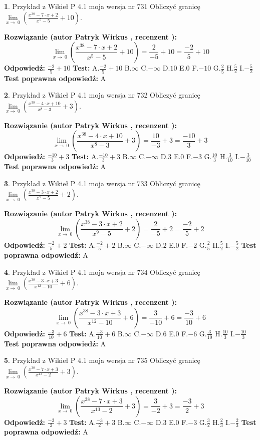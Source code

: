 \documentclass[12pt, a4paper]{article}
\theoremstyle{definition} %
\newtheorem{zad}{}
\newcommand{\zadStart}[1]{\begin{zad}#1\newline}
\newcommand{\zadStop}{\end{zad}}
\newcommand{\rozwStart}[2]{\noindent \textbf{Rozwiązanie (autor #1 , recenzent #2): }\newline}
\newcommand{\rozwStop}{\newline}
\newcommand{\odpStart}{\noindent \textbf{Odpowiedź:}\newline}
\newcommand{\odpStop}{\newline}
\newcommand{\testStart}{\noindent \textbf{Test:}\newline}
\newcommand{\testStop}{\newline}
\newcommand{\kluczStart}{\noindent \textbf{Test poprawna odpowiedź:}\newline}
\newcommand{\kluczStop}{\newline}
\begin{document}
\zadStart{Przykład z Wikieł P 4.1 moja wersja nr 731}
Obliczyć granicę $\lim\limits_{x\to\ 0}(\frac{x^{38}-7 \cdot x +2}{x^{5}-5}+10)$.
\zadStop
\rozwStart{Patryk Wirkus}{}
$$\lim\limits_{x\to\ 0}(\frac{x^{38}-7 \cdot x +2}{x^{5}-5}+10)=\frac{2}{-5}+10=\frac{-2}{5}+10$$
\rozwStop
\odpStart
$\frac{-2}{5}+10$
\odpStop
\testStart
A.$\frac{-2}{5}+10$
B.$\infty$
C.$-\infty$
D.$10$
E.$0$
F.$-10$
G.$\frac{2}{5}$
H.$\frac{5}{2}$
I.$-\frac{5}{2}$
\testStop
\kluczStart
A
\kluczStop



\zadStart{Przykład z Wikieł P 4.1 moja wersja nr 732}
Obliczyć granicę $\lim\limits_{x\to\ 0}(\frac{x^{38}-4 \cdot x +10}{x^{8}-3}+3)$.
\zadStop
\rozwStart{Patryk Wirkus}{}
$$\lim\limits_{x\to\ 0}(\frac{x^{38}-4 \cdot x +10}{x^{8}-3}+3)=\frac{10}{-3}+3=\frac{-10}{3}+3$$
\rozwStop
\odpStart
$\frac{-10}{3}+3$
\odpStop
\testStart
A.$\frac{-10}{3}+3$
B.$\infty$
C.$-\infty$
D.$3$
E.$0$
F.$-3$
G.$\frac{10}{3}$
H.$\frac{3}{10}$
I.$-\frac{3}{10}$
\testStop
\kluczStart
A
\kluczStop



\zadStart{Przykład z Wikieł P 4.1 moja wersja nr 733}
Obliczyć granicę $\lim\limits_{x\to\ 0}(\frac{x^{38}-3 \cdot x +2}{x^{9}-5}+2)$.
\zadStop
\rozwStart{Patryk Wirkus}{}
$$\lim\limits_{x\to\ 0}(\frac{x^{38}-3 \cdot x +2}{x^{9}-5}+2)=\frac{2}{-5}+2=\frac{-2}{5}+2$$
\rozwStop
\odpStart
$\frac{-2}{5}+2$
\odpStop
\testStart
A.$\frac{-2}{5}+2$
B.$\infty$
C.$-\infty$
D.$2$
E.$0$
F.$-2$
G.$\frac{2}{5}$
H.$\frac{5}{2}$
I.$-\frac{5}{2}$
\testStop
\kluczStart
A
\kluczStop



\zadStart{Przykład z Wikieł P 4.1 moja wersja nr 734}
Obliczyć granicę $\lim\limits_{x\to\ 0}(\frac{x^{38}-3 \cdot x +3}{x^{12}-10}+6)$.
\zadStop
\rozwStart{Patryk Wirkus}{}
$$\lim\limits_{x\to\ 0}(\frac{x^{38}-3 \cdot x +3}{x^{12}-10}+6)=\frac{3}{-10}+6=\frac{-3}{10}+6$$
\rozwStop
\odpStart
$\frac{-3}{10}+6$
\odpStop
\testStart
A.$\frac{-3}{10}+6$
B.$\infty$
C.$-\infty$
D.$6$
E.$0$
F.$-6$
G.$\frac{3}{10}$
H.$\frac{10}{3}$
I.$-\frac{10}{3}$
\testStop
\kluczStart
A
\kluczStop



\zadStart{Przykład z Wikieł P 4.1 moja wersja nr 735}
Obliczyć granicę $\lim\limits_{x\to\ 0}(\frac{x^{38}-7 \cdot x +3}{x^{13}-2}+3)$.
\zadStop
\rozwStart{Patryk Wirkus}{}
$$\lim\limits_{x\to\ 0}(\frac{x^{38}-7 \cdot x +3}{x^{13}-2}+3)=\frac{3}{-2}+3=\frac{-3}{2}+3$$
\rozwStop
\odpStart
$\frac{-3}{2}+3$
\odpStop
\testStart
A.$\frac{-3}{2}+3$
B.$\infty$
C.$-\infty$
D.$3$
E.$0$
F.$-3$
G.$\frac{3}{2}$
H.$\frac{2}{3}$
I.$-\frac{2}{3}$
\testStop
\kluczStart
A
\kluczStop
\end{document}
